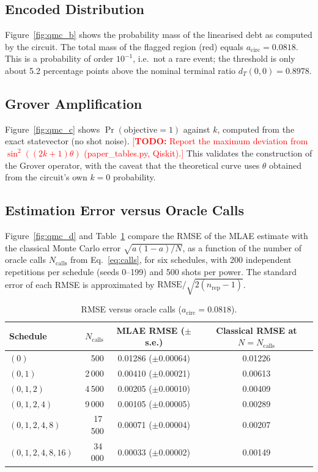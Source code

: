 \documentclass[pdflatex,sn-mathphys-num]{sn-jnl}%
\newcommand{\todo}[1]{\textcolor{red}{[\textbf{TODO:} #1]}}
\theoremstyle{thmstyleone}%
\theoremstyle{thmstyletwo}%
\theoremstyle{thmstylethree}%
\begin{document}
\subsection{Encoded Distribution}
Figure~\ref{fig:qmc_b} shows the probability mass of the linearised debt as computed by the circuit. The total mass of the flagged region (red) equals $a_{\mathrm{circ}}=0.0818$. This is a probability of order $10^{-1}$, i.e.\ not a rare event; the threshold is only about 5.2 percentage points above the nominal terminal ratio $d_T(0,0)=0.8978$.

\subsection{Grover Amplification}
Figure~\ref{fig:qmc_c} shows $\Pr(\text{objective}=1)$ against $k$, computed from the exact statevector (no shot noise). \todo{Report the maximum deviation from $\sin^2((2k+1)\theta)$ (paper\_tables.py, Qiskit).} This validates the construction of the Grover operator, with the caveat that the theoretical curve uses $\theta$ obtained from the circuit's own $k=0$ probability.

\subsection{Estimation Error versus Oracle Calls}
Figure~\ref{fig:qmc_d} and Table~\ref{tab:rmse} compare the RMSE of the MLAE estimate with the classical Monte Carlo error $\sqrt{a(1-a)/N}$, as a function of the number of oracle calls $N_{\mathrm{calls}}$ from Eq.~\eqref{eq:calls}, for six schedules, with 200 independent repetitions per schedule (seeds 0--199) and 500 shots per power. The standard error of each RMSE is approximated by $\mathrm{RMSE}/\sqrt{2(n_{\mathrm{rep}}-1)}$.

\begin{table}[h!]
\centering
\caption{RMSE versus oracle calls ($a_{\mathrm{circ}}=0.0818$).}\label{tab:rmse}
\begin{tabular}{lrcc}
\toprule
Schedule & $N_{\mathrm{calls}}$ & MLAE RMSE ($\pm$ s.e.) & Classical RMSE at $N=N_{\mathrm{calls}}$ \\ \midrule
$(0)$ & 500 & 0.01286 ($\pm$0.00064) & 0.01226 \\
$(0,1)$ & 2\,000 & 0.00410 ($\pm$0.00021) & 0.00613 \\
$(0,1,2)$ & 4\,500 & 0.00205 ($\pm$0.00010) & 0.00409 \\
$(0,1,2,4)$ & 9\,000 & 0.00105 ($\pm$0.00005) & 0.00289 \\
$(0,1,2,4,8)$ & 17\,500 & 0.00071 ($\pm$0.00004) & 0.00207 \\
$(0,1,2,4,8,16)$ & 34\,000 & 0.00033 ($\pm$0.00002) & 0.00149 \\
\bottomrule
\end{tabular}
\end{table}
\end{document}
